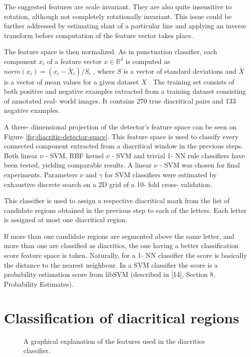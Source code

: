 \documentclass[12pt,a4paper]{report}
\begin{document}
The suggested features are scale invariant. They are also quite insensitive to rotation, although not completely rotationally invariant. This issue could be further addressed by estimating slant of a particular line and applying an inverse transform before computation of the feature vector takes place.

The feature space is then normalized. As in punctuation classifier, each component $x_{i}$ of a feature vector $x\in \mathbb{R}^{4}$ is computed as $norm(x_{i}) = (x_{i} - \bar{X}_{i}) / S_{i}$ , where $S$ is a vector of standard deviations and $\bar{X}$ is a vector of mean values for a given dataset $X$ . The training set consists of both positive and negative examples extracted from a training dataset consisting of annotated real- world images. It contains 270 true diacritical pairs and 133 negative examples.

A three- dimensional projection of the detector's feature space can be seen on Figure \ref{fig:diacritic-detector-space}. This feature space is used to classify every connected component extracted from a diacritical window in the previous steps. Both linear $\nu$ - SVM, RBF kernel $\nu$ - SVM and trivial 1- NN rule classifiers have been tested, yielding comparable results. A linear $\nu$ - SVM was chosen for final experiments. Parameters $\nu$ and $\gamma$ for SVM classifiers were estimated by exhaustive discrete search on a 2D grid of a 10- fold cross- validation.

This classifier is used to assign a respective diacritical mark from the list of candidate regions obtained in the previous step to each of the letters. Each letter is assigned at most one diacritical region.

If more than one candidate regions are segmented above the same letter, and more than one are classified as diacritics, the one having a better classification score feature space is taken. Naturally, for a 1- NN classifier the score is basically the distance to the nearest neighbour. In a SVM classifier the score is a probability estimation score from libSVM (described in [14], Section 8, Probability Estimates).

\section{Classification of diacritical regions}
\begin{figure}[htbp]
    \centering
    \caption{A graphical explanation of the features used in the diacritics classifier.}
    \label{fig:diacritic-features}
\end{figure}
\end{document}

